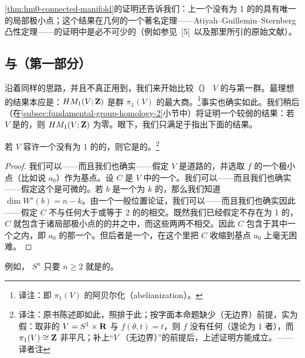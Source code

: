 \begin{remark}\label{thm:unique-local-minimum}
\cref{thm:hm0-connected-manifold}的证明还告诉我们：\trCompact\trConnected\trManifold{}上一个没有\trIndex{}为 1 的\trCriticalPoint{}的\trMorseFunction{}具有唯一的局部极小点；这个结果在\trSymplectic{}几何的一个著名定理——Atiyah--Guillemin--Sternberg 凸性定理——的证明中是必不可少的（例如参见~[5]~以及那里所引的原始文献）。
\end{remark}

\subsection{\trFundamentalGroup{}与\trHomology{}（第一部分）}
\label{subsec:fundamental-group-homology-1}

沿着同样的思路，并且不真正用到\trMorseComplex，我们来开始比较（\trConnected{}）\trManifold{} $V$ 的\trFundamentalGroup{}与第一\trHomology{}群。最理想的结果本应是：$HM_1(V;\mathbf{Z})$ 是群 $\pi_1(V)$ 的最大\trAbelianGroup{}商。\footnote{译注：即 $\pi_1(V)$ 的阿贝尔化（abelianization）。}事实也确实如此。我们稍后（在\cref{subsec:fundamental-group-homology-2}小节中）将证明一个较弱的结果：若 $V$ 是\trSimplyConnected{}的，则 $HM_1(V;\mathbf{Z})$ 为零。眼下，我们只满足于指出下面的结果。

\begin{proposition}\label{thm:no-index-one-simply-connected}
若\trManifold{} $V$ 容许一个没有\trIndex{}为 1 的\trCriticalPoint{}的\trMorseFunction，则它是\trSimplyConnected{}的。\footnote{译注：原书陈述即如此，照排于此；按字面本命题缺少\trCompact{}（无边界）前提，实为假：取非\trCompact{}的 $V=S^1\times\mathbf{R}$ 与 $f(\theta,t)=t$，则 $f$ 没有任何\trCriticalPoint{}（遑论\trIndex{}为 1 者），而 $\pi_1(V)\cong\mathbf{Z}$ 非平凡；补上“$V$ \trCompact{}（无边界）\trConnected{}”的前提后，上述证明方能成立。——译者注}
\end{proposition}

\begin{proof}
我们可以——而且我们也确实——假定 $V$ 是道路\trConnected{}的，并选取 $f$ 的一个极小点（比如说 $a_0$）作为基点。设 $C$ 是 $V$ 中的一个\trLoop。我们可以——而且我们也确实——假定这个\trLoop{}是可微的。若 $b$ 是一个\trIndex{}为 $k$ 的\trCriticalPoint，那么我们知道 $\dim W^s(b)=n-k$。由一个一般位置论证，我们可以——而且我们也确实因此——假定 $C$ 不与任何\trIndex{}大于或等于 2 的\trCriticalPoint{}的\trStableManifold{}相交。既然我们已经假定不存在\trIndex{}为 1 的\trCriticalPoint，\trLoop{} $C$ 就包含于诸局部极小点的\trStableManifold{}的并之中，而这些\trStableManifold{}两两不相交。因此 $C$ 包含于其中一个\trStableManifold{}之内，即 $a_0$ 的那一个。但后者是一个\trDisk，在这个\trDisk{}里把 $C$ 收缩到基点 $a_0$ 上毫无困难。
\end{proof}

\begin{example}\label{thm:sphere-simply-connected}
例如，\trSphere{} $S^n$ 只要 $n\ge 2$ 就是\trSimplyConnected{}的。
\end{example}
